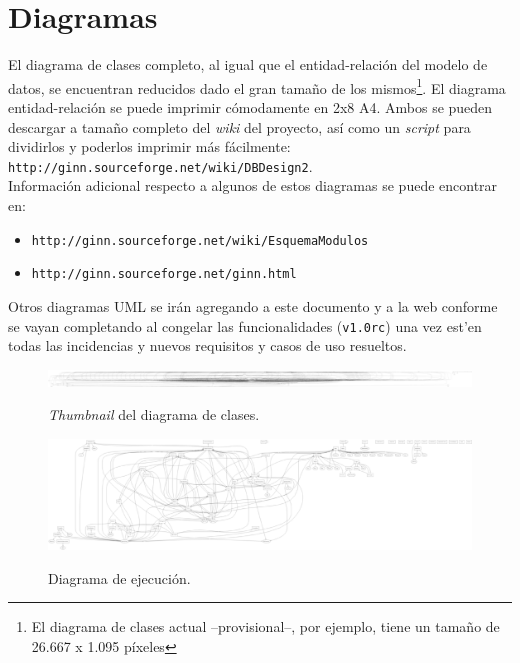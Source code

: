 \documentclass[a4paper]{article}
\newcommand{\marginalnote}[1]{\mbox{}\marginpar{\raggedright\hspace{0pt}#1}}
\newcommand{\iconomargen}[2]{%
  \marginalnote{%
    \parbox[t][\baselineskip * (#1-1)][b]{\marginparwidth}{%
      \texttt{[image: \#2]}%
    }
  }
}
\begin{document}
    \section{Diagramas}
    El diagrama de clases completo, al igual que el entidad-relación del modelo de datos, se encuentran reducidos dado el gran tamaño de los mismos\footnote{El diagrama de clases actual --provisional--, por ejemplo, tiene un tamaño de 26.667 x 1.095 píxeles}. El diagrama entidad-relación se puede imprimir cómodamente en 2x8 A4. Ambos se pueden descargar a tamaño completo del \emph{wiki} del proyecto, así como un \emph{script} para dividirlos y poderlos imprimir más fácilmente:\\
\iconomargen{3}{link} \texttt{http://ginn.sourceforge.net/wiki/DBDesign2}.\\
    Información adicional respecto a algunos de estos diagramas se puede encontrar en: 
    \begin{itemize}
        \item \texttt{http://ginn.sourceforge.net/wiki/EsquemaModulos}
        \item \texttt{http://ginn.sourceforge.net/ginn.html}
    \end{itemize}
    Otros diagramas UML se irán agregando a este documento y a la web conforme se vayan completando al congelar las funcionalidades (\texttt{v1.0rc}) una vez est'en todas las incidencias y nuevos requisitos y casos de uso resueltos.
    \begin{figure}[!ht]
        \centering
                \includegraphics[width=14.5cm]{ginn_pclases.eps}\\
            \caption{\emph{Thumbnail} del diagrama de clases.}
            \label{diagrama:clases}
    \end{figure}\par

    \begin{figure}[!ht]
        \centering
                \includegraphics[width=14.5cm]{ginn_clases.eps}\\
            \caption{Diagrama de ejecución.}
            \label{diagrama:ejecucion}
    \end{figure}\par
    
\end{document}
